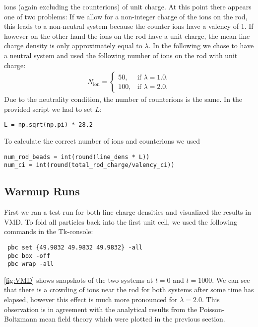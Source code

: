 \documentclass[a4paper,10pt,bibtotoc]{scrartcl}
\begin{document}
ions (again excluding the counterions) of unit charge. At this point there appears one of two problems: If we allow for a non-integer charge of the ions on the rod, this leads to a non-neutral system because the counter ions have a valency of 1. If however on the other hand the ions on the rod have a unit charge, the mean line charge density is only approximately equal to $\lambda$. In the following we chose to have a neutral system and used the following number of ions on the rod with unit charge:
\begin{align}
 N_{\mathrm{ion}} =  \begin{cases}
    50, & \text{if $\lambda=1.0$}.\\
    100, & \text{if $\lambda=2.0$}.
  \end{cases}
\end{align}
Due to the neutrality condition, the number of counterions is the same.
In the provided script we had to set $L$:
\begin{lstlisting}
L = np.sqrt(np.pi) * 28.2
\end{lstlisting}
To calculate the correct number of ions and counterions we used
\begin{lstlisting}
num_rod_beads = int(round(line_dens * L))
num_ci = int(round(total_rod_charge/valency_ci))
\end{lstlisting}





\subsection{Warmup Runs}
First we ran a test run for both line charge densities and visualized the results in VMD. To fold all particles back into the first unit cell, we used the following commands in the Tk-console:
\begin{lstlisting}
 pbc set {49.9832 49.9832 49.9832} -all
 pbc box -off
 pbc wrap -all
\end{lstlisting}
\autoref{fig:VMD} shows snapshots of the two systems at $t=0$ and $t=1000$. We can see that there is a crowding of ions near the rod for both systems after some time has elapsed, however this effect is much more pronounced for $\lambda=2.0$. This observation is in agreement with the analytical results from the Poisson-Boltzmann mean field theory which were plotted in the previous section.
\end{document}
